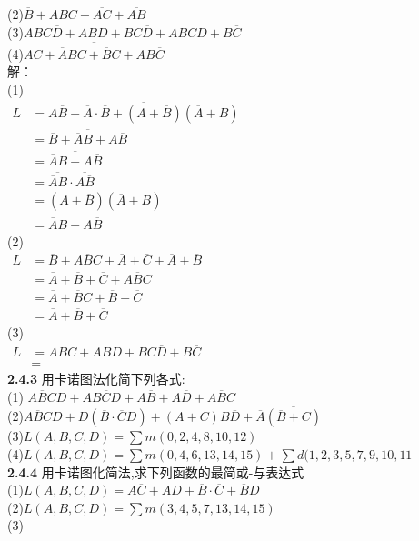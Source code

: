 \documentclass[a4paper,11pt,UTF8]{article}
\begin{document}
(2)$\overline{B}+ABC+\overline{AC}+\overline{AB}$\\
(3)${ABC}{\overline{D}+ABD+BC}{\overline{D}+ABCD+B}{\overline{C}}$\\
(4)$\overline{{\overline{AC+\overline{A}BC}+\overline{B}C+AB\overline{C}}}$\\
解：\\
(1)\\
$\begin{aligned}
	L&=\overline{A\overline{B}+\overline{A}\cdot\overline{B}+(A+\overline{B})(\overline{A}+B)}\\
	&=\overline{\overline{B}+\overline{A}B+A\overline{B}}\\
	&=\overline{\overline{A}B+A\overline{B}}\\
	&=\overline{\overline{A}B}\cdot\overline{A\overline{B}}\\
	&=(A+\overline{B})(\overline{A}+B)\\
	&=\overline{A}B+A\overline{B}
\end{aligned}$\\
(2)\\
$\begin{aligned}
	L&=\overline{B}+A\overline{B}C+\overline{A}+\overline{C}+\overline{A}+\overline{B}\\
	&=\overline{A}+\overline{B}+\overline{C}+A\overline{B}C\\
	&=\overline{A}+\overline{B}C+\overline{B}+\overline{C}\\
	&=\overline{A}+\overline{B}+\overline{C}
\end{aligned}$\\
(3)\\
$\begin{aligned}
	L&=ABC+ABD+BC\overline{D}+B\overline{C}\\
	&=
\end{aligned}$\\
\textbf{2.4.3} 用卡诺图法化简下列各式:\\
(1) $A\overline{B}CD+AB\overline{C}D+A\overline{B}+A\overline{D}+A\overline{B}C$\\
(2)$
A\overline{B}CD+D(\overline{B}\cdot\overline{C}D)+(A+C)B\overline{D}+\overline{A}\overline{(\overline{B}+C)}
$\\
(3)$
L(A,B,C,D)=\sum m(0,2,4,8,10,12)
$\\
(4)$
L(A,B,C,D)=\sum m(0,4,6,13,14,15)+\sum d(1,2,3,5,7,9,10,11
$\\ 
\textbf{2.4.4} 用卡诺图化简法,求下列函数的最简或-与表达式\\
(1)$
L(A,B,C,D)=A\overline{C}+AD+\overline{B}\cdot\overline{C}+\overline{B}D
$\\
(2)$
L(A,B,C,D)=\sum m(3,4,5,7,13,14,15)
$\\
(3)
\end{document}
